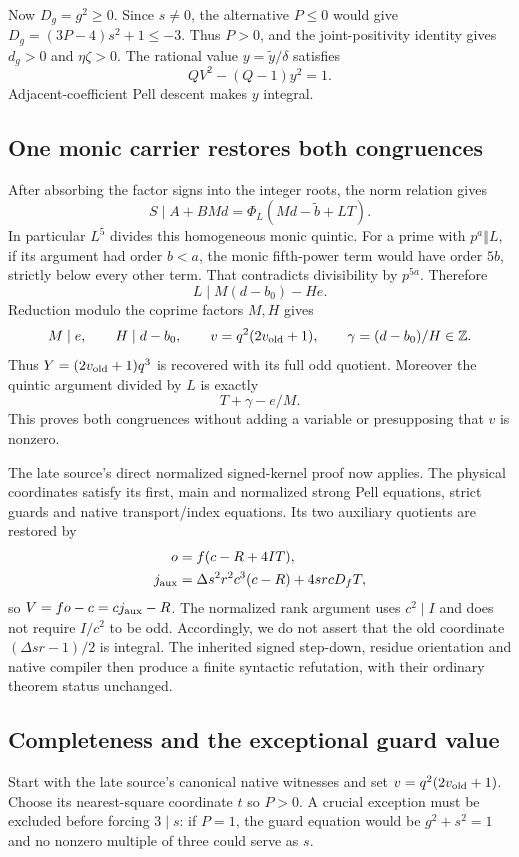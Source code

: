 \documentclass[11pt]{article}
\begin{document}
Now $D_g=g^2\ge0$. Since $s\ne0$, the alternative $P\le0$ would give
$D_g=(3P-4)s^2+1\le-3$. Thus $P>0$, and the joint-positivity identity
gives $d_g>0$ and $\eta\zeta>0$.
The rational value $y=\widetilde y/\delta$ satisfies
\[
 QV^2-(Q-1)y^2=1.
\]
Adjacent-coefficient Pell descent makes $y$ integral.

\subsection{One monic carrier restores both congruences}
After absorbing the factor signs into the integer roots, the norm relation
gives
\[
 S\mid A+BMd=\Phi_L(Md-\widetilde b+LT).
\]
In particular $L^5$ divides this homogeneous monic quintic.
For a prime with $p^a\Vert L$, if its argument had order $b<a$,
the monic fifth-power term would have order $5b$, strictly below every
other term. That contradicts divisibility by $p^{5a}$. Therefore
\[
 L\mid M(d-b_0)-He.
\]
Reduction modulo the coprime factors $M,H$ gives
\[
 M\mid e,\qquad H\mid d-b_0,
 \qquad v=q^2(2v_{\rm old}+1),\qquad
 \gamma=(d-b_0)/H\in\mathbb Z.
\]
Thus $Y=(2v_{\rm old}+1)q^3$ is recovered with its full odd quotient.
Moreover the quintic argument divided by $L$ is exactly
\[
 T+\gamma-e/M.
\]
This proves both congruences without adding a variable or presupposing
that $v$ is nonzero.

The late source's direct normalized signed-kernel proof now applies.
The physical coordinates satisfy its first, main and normalized strong
Pell equations, strict guards and native transport/index equations.
Its two auxiliary quotients are restored by
\begin{align*}
 o&=f(c-R+4IT),\\
 j_{\rm aux}&=\Delta s^2r^2c^3(c-R)+4srcD_fT,
\end{align*}
so $V=fo-c=cj_{\rm aux}-R$. The normalized rank argument uses
$c^2\mid I$ and does not require $I/c^2$ to be odd. Accordingly, we do
not assert that the old coordinate $(\Delta sr-1)/2$ is integral.
The inherited signed step-down, residue orientation and native compiler
then produce a finite syntactic refutation, with their ordinary theorem
status unchanged.

\subsection{Completeness and the exceptional guard value}
Start with the late source's canonical native witnesses and set
$v=q^2(2v_{\rm old}+1)$. Choose its nearest-square coordinate $t$ so
$P>0$. A crucial exception must be excluded before forcing $3\mid s$:
if $P=1$, the guard equation would be $g^2+s^2=1$ and no nonzero
multiple of three could serve as $s$.
\end{document}
